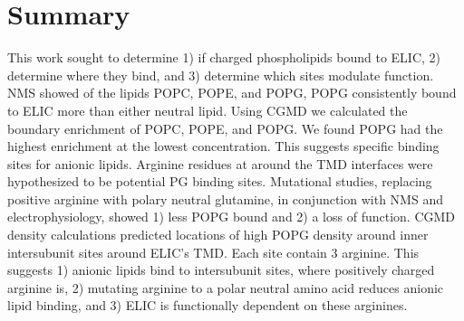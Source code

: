 \section[]{Summary}

This work sought to determine 1) if charged phospholipids bound to ELIC, 2) determine where they bind, and 3) determine which sites modulate function. NMS showed of the lipids POPC, POPE, and POPG, POPG consistently bound to ELIC more than either neutral lipid. Using CGMD we calculated the boundary enrichment of POPC, POPE, and POPG. We found POPG had the highest enrichment at the lowest concentration. This suggests specific binding sites for anionic lipids. Arginine residues at around the  TMD interfaces were hypothesized to be potential PG binding sites. Mutational studies, replacing positive arginine with polary neutral glutamine, in conjunction with NMS and electrophysiology, showed 1) less POPG bound and 2) a loss of function. CGMD density calculations predicted locations of high POPG density around inner intersubunit sites around ELIC's TMD. Each site contain 3 arginine. This suggests 1) anionic lipids bind to intersubunit sites, where positively charged arginine is, 2) mutating arginine to a polar neutral amino acid reduces anionic lipid binding, and 3) ELIC is functionally dependent on these arginines.
